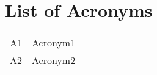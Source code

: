 \chapter{List of Acronyms}

\begin{table}[h]
\begin{tabular}{p{2.7cm}lp{8cm}l}

A1               & Acronym1 \\
A2               & Acronym2 \\ 	

\end{tabular}
\end{table}